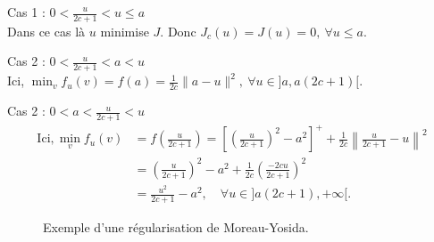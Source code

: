 \documentclass[main.tex]{subfiles}
\begin{document}
\begin{myitemize}
\renewcommand{\labelitemi}{\scriptsize$\bullet$} 
\item Cas 1 : $0 < \frac{u}{2c+1} < u \leq a$\\ %
Dans ce cas là $u$ minimise $J$. Donc $J_c(u)=J(u)=0, \ \forall u \leq a$.

\item Cas 2 : $0 < \frac{u}{2c+1} < a < u \qquad$ 
\\
Ici, $\min_v f_u(v) = f(a) = \frac{1}{2c} \| a-u\|^2, \ \forall u \in ]a,a(2c+1)[.$
\item Cas 2 : $0 < a < \frac{u}{2c+1} < u \qquad$ 
\\
\begin{align*}
\textrm{Ici}, \min_v f_u(v) &= f\left( \frac{u}{2c+1} \right) = \left[ \left( \frac{u}{2c+1} \right)^2 -a^2 \right]^+ + \frac{1}{2c} \left\| \frac{u}{2c+1}-u \right\|^2 \\
& = \left( \frac{u}{2c+1} \right)^2 -a^2 + \frac{1}{2c} \left( \frac{-2cu}{2c+1} \right)^2 \\
& = \frac{u^2}{2c+1} -a^2, \quad \forall u \in ]a(2c+1),+\infty[.
\end{align*}
\end{myitemize}
\begin{figure}
\centering
{}
\caption{\label{fig:regul_yosida} Exemple d'une régularisation de Moreau-Yosida.}
\end{figure}
\end{document}
